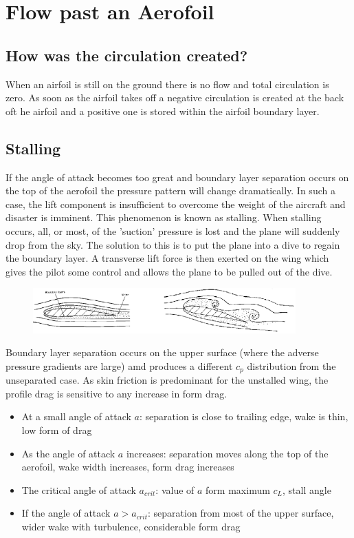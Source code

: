 \documentclass[class=report, crop=false, 12pt,a4paper]{standalone}
\begin{document}
\section{Flow past an Aerofoil}
\subsection{How was the circulation created?}
When an airfoil is still on the ground there is no flow and total circulation is zero. As soon as the airfoil takes off a negative circulation is created at the back oft he airfoil and a positive one is stored within the airfoil boundary layer.
\subsection{Stalling}
If the angle of attack becomes too great and boundary layer separation occurs on the top of the aerofoil the pressure pattern will change dramatically. In such a case, the lift component is insufficient to overcome the weight of the aircraft and disaster is imminent. This phenomenon is known as stalling. When stalling occurs, all, or most, of the 'suction' pressure is lost and the plane will suddenly drop from the sky. The solution to this is to put the plane into a dive to regain the boundary layer. A transverse lift force is then exerted on the wing which gives the pilot some control and allows the plane to be pulled out of the dive. 
\begin{figure}[H]
  \centering
  \includegraphics[width = 0.9\textwidth]{../img/diagram42.png}
\end{figure}
Boundary layer separation occurs on the upper surface (where the adverse pressure gradients are large) amd produces a different $c_p$ distribution from the unseparated case. As skin friction is predominant for the unstalled wing, the profile drag is sensitive to any increase in form drag.
\begin{itemize}
  \item At a small angle of attack $a$: separation is close to trailing edge, wake is thin, low form of drag
  \item As the angle of attack $a$ increases: separation moves along the top of the aerofoil, wake width increases, form drag increases
  \item The critical angle of attack $a_{crit}$: value of $a$ form maximum $c_L$, stall angle
  \item If the angle of attack $a > a_{crit}$: separation from most of the upper surface, wider wake with turbulence, considerable form drag
\end{itemize}
\end{document}
